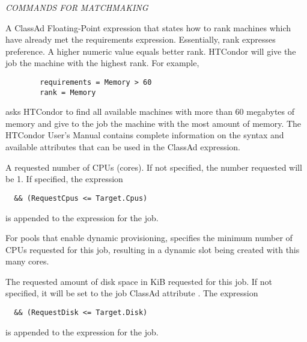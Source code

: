 \emph{COMMANDS FOR MATCHMAKING}
\begin{description} 


\label{man-condor-submit-rank}
\item[rank = $<$ClassAd Float Expression$>$]
A ClassAd Floating-Point
expression that states how to rank machines which have already met the requirements
expression. Essentially, rank expresses preference.  A higher numeric value
equals better rank. HTCondor will give the job the machine with the
highest rank.  For example,
\begin{verbatim}
        requirements = Memory > 60
        rank = Memory
\end{verbatim}
asks HTCondor to find all available machines with more than 60 megabytes of memory
and give to the job the machine with the most amount of memory.
The HTCondor User's
Manual contains complete information on the syntax and available attributes
that can be used in the ClassAd expression.


\label{man-condor-submit-request-cpus}
\item[request\_cpus = $<$num-cpus$>$] 
A requested number of CPUs (cores).
If not specified, the number requested will be 1.
If specified, 
the expression
\begin{verbatim}
  && (RequestCpus <= Target.Cpus) 
\end{verbatim}
is appended to the  expression for the job.

For pools that enable
dynamic  provisioning,
specifies the minimum number of CPUs requested for this job,
resulting in a dynamic slot being created with this many cores.


\label{man-condor-submit-request-disk}
\item[request\_disk = $<$quantity$>$] 
The requested amount of disk space in KiB requested for this job.
If not specified, 
it will be set to the job ClassAd attribute .
The expression
\begin{verbatim}
  && (RequestDisk <= Target.Disk) 
\end{verbatim}
is appended to the  expression for the job.


\end{description}
